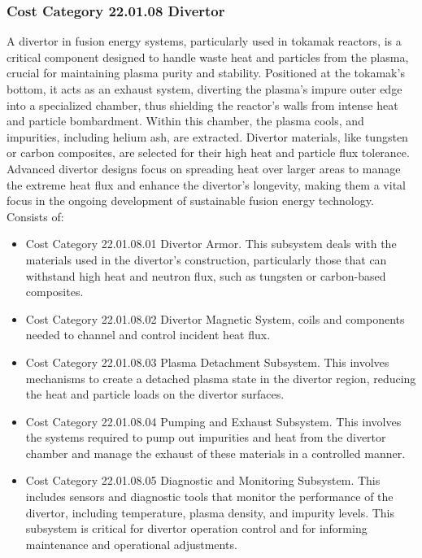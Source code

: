 \subsubsection*{Cost Category 22.01.08 Divertor}

A divertor in fusion energy systems, particularly used in tokamak reactors, is a critical component designed to handle waste heat and particles from the plasma, crucial for maintaining plasma purity and stability. Positioned at the tokamak's bottom, it acts as an exhaust system, diverting the plasma's impure outer edge into a specialized chamber, thus shielding the reactor's walls from intense heat and particle bombardment. Within this chamber, the plasma cools, and impurities, including helium ash, are extracted. Divertor materials, like tungsten or carbon composites, are selected for their high heat and particle flux tolerance. Advanced divertor designs focus on spreading heat over larger areas to manage the extreme heat flux and enhance the divertor's longevity, making them a vital focus in the ongoing development of sustainable fusion energy technology.\\

Consists of:

\begin{itemize}
    \item Cost Category 22.01.08.01 Divertor Armor. This subsystem deals with the materials used in the divertor's construction, particularly those that can withstand high heat and neutron flux, such as tungsten or carbon-based composites.

\item Cost Category 22.01.08.02 Divertor Magnetic System, coils and components needed to channel and control incident heat flux.

\item  Cost Category 22.01.08.03 Plasma Detachment Subsystem. This involves mechanisms to create a detached plasma state in the divertor region, reducing the heat and particle loads on the divertor surfaces. 


\item Cost Category 22.01.08.04 Pumping and Exhaust Subsystem. This involves the systems required to pump out impurities and heat from the divertor chamber and manage the exhaust of these materials in a controlled manner.

\item Cost Category 22.01.08.05 Diagnostic and Monitoring Subsystem. This includes sensors and diagnostic tools that monitor the performance of the divertor, including temperature, plasma density, and impurity levels. This subsystem is critical for divertor operation control and for informing maintenance and operational adjustments.
\end{itemize}


